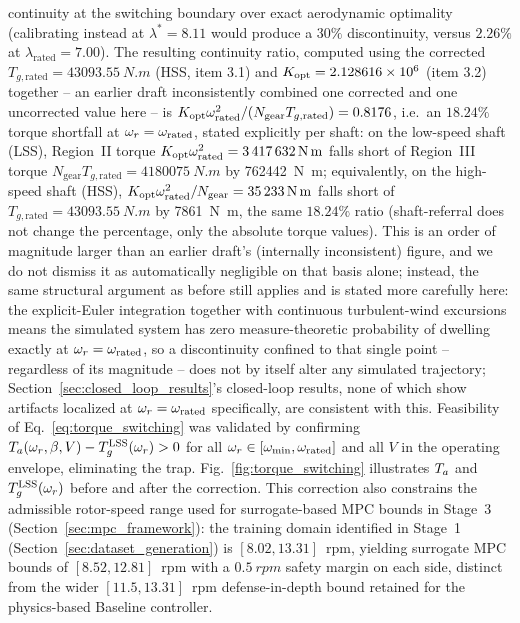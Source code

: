 continuity at the switching boundary over exact aerodynamic optimality
(calibrating instead at $\lambda^{*}=8.11$ would produce a $30\%$
discontinuity, versus $2.26\%$ at $\lambda_{\text{rated}}=7.00$). The
resulting continuity ratio, computed using the corrected
$T_{g,\text{rated}}=\SI{43093.55}{N.m}$ (HSS, item 3.1) and
$K_{\text{opt}}=2.128616\times10^6$ (item 3.2) together -- an earlier draft
inconsistently combined one corrected and one uncorrected value here
-- is
$K_{\text{opt}} \omega_{\text{rated}}^{2} / (N_{\text{gear}} T_{g,\text{rated}}) = 0.8176$,
i.e.\ an $18.24\%$ torque shortfall at $\omega_r = \omega_{\text{rated}}$, stated
explicitly per shaft: on the low-speed shaft (LSS), Region~II torque
$K_{\text{opt}}\omega_{\text{rated}}^2 = \SI{3417632}{N.m}$ falls short of Region~III
torque $N_{\text{gear}}T_{g,\text{rated}} = \SI{4180075}{N.m}$ by
\SI{762442}{N.m}; equivalently, on the high-speed shaft (HSS),
$K_{\text{opt}}\omega_{\text{rated}}^2/N_{\text{gear}} = \SI{35233}{N.m}$ falls short of
$T_{g,\text{rated}}=\SI{43093.55}{N.m}$ by \SI{7861}{N.m}, the same
$18.24\%$ ratio (shaft-referral does not change the percentage, only
the absolute torque values). This is an order of magnitude larger
than an earlier draft's (internally inconsistent) figure, and we do
not dismiss it as automatically negligible on that basis alone;
instead, the same structural argument as before still applies and is
stated more carefully here: the explicit-Euler integration together
with continuous turbulent-wind excursions means the simulated system
has zero measure-theoretic probability of dwelling exactly at
$\omega_r = \omega_{\text{rated}}$, so a discontinuity confined to that single
point -- regardless of its magnitude -- does not by itself alter any
simulated trajectory; Section~\ref{sec:closed_loop_results}'s
closed-loop results, none of which show artifacts localized at
$\omega_r=\omega_{\text{rated}}$ specifically, are consistent with this. Feasibility of
Eq.~\eqref{eq:torque_switching} was validated by confirming
$T_a(\omega_r,\beta,V) - T_g^{\text{LSS}}(\omega_r) > 0$ for all
$\omega_r \in [\omega_{\min}, \omega_{\text{rated}}]$ and all $V$ in the operating
envelope, eliminating the trap. Fig.~\ref{fig:torque_switching} illustrates
$T_a$ and $T_g^{\text{LSS}}(\omega_r)$ before and after the correction. This
correction also constrains the admissible rotor-speed range used for
surrogate-based MPC bounds in Stage~3
(Section~\ref{sec:mpc_framework}): the training domain identified in
Stage~1 (Section~\ref{sec:dataset_generation}) is $[8.02,13.31]$~rpm,
yielding surrogate MPC bounds of $[8.52,12.81]$~rpm with a
$\SI{0.5}{rpm}$ safety margin on each side, distinct from the wider
$[11.5,13.31]$~rpm defense-in-depth bound retained for the physics-based
Baseline controller.

